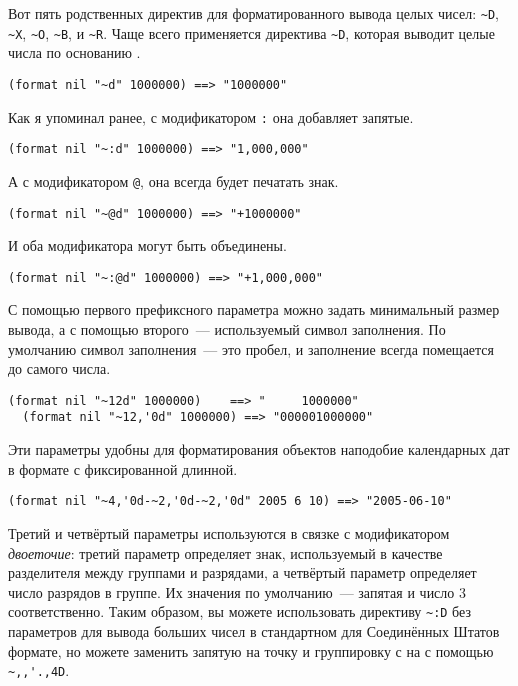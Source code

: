 Вот пять родственных директив для форматированного вывода целых чисел: \lstinline!~D!,
\lstinline!~X!, \lstinline!~O!, \lstinline!~B!, и \lstinline!~R!. Чаще всего применяется
директива \lstinline!~D!, которая выводит целые числа по основанию .

\begin{lstlisting}[style=lisprepl]
  (format nil "~d" 1000000) ==> "1000000"
\end{lstlisting}

Как я упоминал ранее, с модификатором \lstinline!:! она добавляет запятые.

\begin{lstlisting}[style=lisprepl]
  (format nil "~:d" 1000000) ==> "1,000,000"
\end{lstlisting}

А с модификатором \lstinline!@!, она всегда будет печатать знак.

\begin{lstlisting}[style=lisprepl]
  (format nil "~@d" 1000000) ==> "+1000000"
\end{lstlisting}

И оба модификатора могут быть объединены.

\begin{lstlisting}[style=lisprepl]
  (format nil "~:@d" 1000000) ==> "+1,000,000"
\end{lstlisting}

С помощью первого префиксного параметра можно задать минимальный размер вывода, а с
помощью второго~--- используемый символ заполнения. По умолчанию символ заполнения~--- это
пробел, и заполнение всегда помещается до самого числа.

\begin{lstlisting}[style=lisprepl]
  (format nil "~12d" 1000000)    ==> "     1000000"
  (format nil "~12,'0d" 1000000) ==> "000001000000"
\end{lstlisting}

Эти параметры удобны для форматирования объектов наподобие календарных дат в формате с
фиксированной длинной.

\begin{lstlisting}[style=lisprepl]
  (format nil "~4,'0d-~2,'0d-~2,'0d" 2005 6 10) ==> "2005-06-10"
\end{lstlisting}

Третий и четвёртый параметры используются в связке с модификатором \textit{двоеточие}:
третий параметр определяет знак, используемый в качестве разделителя между группами и
разрядами, а четвёртый параметр определяет число разрядов в группе. Их значения по
умолчанию~--- запятая и число 3 соответственно. Таким образом, вы можете использовать
директиву \lstinline!~:D! без параметров для вывода больших чисел в стандартном для
Соединённых Штатов формате, но можете заменить запятую на точку и группировку с 
на  с помощью \lstinline!~,,'.,4D!.

